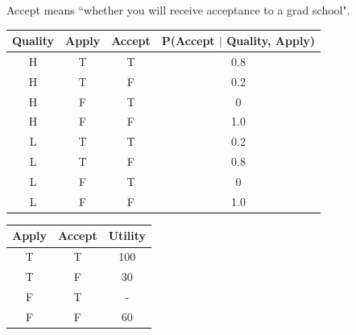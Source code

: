 \documentclass[12pt]{article}
\begin{document}
Accept means ``whether you will receive acceptance to a grad school".
\begin{table}[!h]
    \centering
    \begin{tabular}{c|c|c|c}
        \hline
        Quality & Apply  & Accept  & P(Accept $\mid$ Quality, Apply)  \\
        \hline
        H     &   T      &  T       &  0.8                 \\
        H     &   T      &  F       &  0.2                 \\
        H     &   F      &  T       &  0                   \\
        H     &   F      &  F       &  1.0                 \\
        L     &   T      &  T       &  0.2                \\
        L     &   T      &  F       &  0.8                \\
        L     &   F      &  T       &  0                  \\
        L     &   F      &  F       &  1.0                 \\
        \hline
    \end{tabular}
\end{table}

\begin{table}[!h]
    \centering
    \begin{tabular}{c|c|c}
        \hline
        Apply  & Accept   & Utility               \\
        \hline
        T      &  T       &  100                  \\
        T      &  F       &  30                   \\
        F      &  T       &  -                    \\
        F      &  F       &  60                   \\
        \hline
    \end{tabular}
\end{table}
\end{document}
